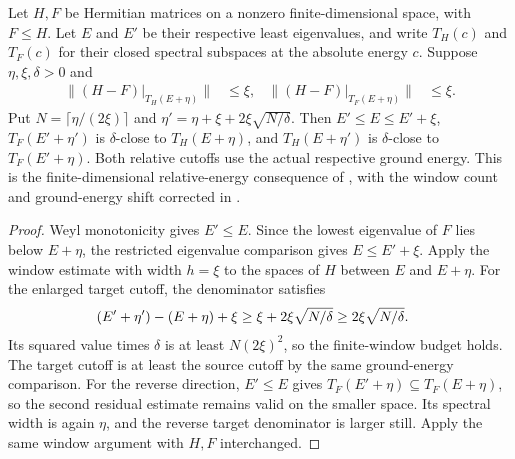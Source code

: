 \begin{theorem}
    \label{thm:relative_low_energy_spaces_close}
    \leanok
    Let $H,F$ be Hermitian matrices on a nonzero finite-dimensional space,
    with $F\le H$. Let $E$ and $E'$ be their respective least eigenvalues,
    and write $T_H(c)$ and $T_F(c)$ for their closed spectral subspaces
    at the absolute energy $c$.
    Suppose $\eta,\xi,\delta>0$ and
    \begin{align}
        \|(H-F)|_{T_H(E+\eta)}\| & \le\xi, &
        \|(H-F)|_{T_F(E+\eta)}\| & \le\xi.
        \label{eq:relative_low_energy_residuals}
    \end{align}
    Put $N=\lceil\eta/(2\xi)\rceil$ and
    $\eta'=\eta+\xi+2\xi\sqrt{N/\delta}$.
    Then $E'\le E\le E'+\xi$,
    $T_F(E'+\eta')$ is $\delta$-close to $T_H(E+\eta)$, and
    $T_H(E+\eta')$ is $\delta$-close to $T_F(E'+\eta)$.
    Both relative cutoffs use the actual respective ground energy.
    This is the finite-dimensional relative-energy consequence of
    \cite[lines 955--968]{Arad2016RigorousRG}, with the window count and
    ground-energy shift corrected in
    \cite{gap:alvv16_hard_truncation_windows}.
\end{theorem}
\begin{proof}
    \leanok
    Weyl monotonicity gives $E'\le E$. Since the lowest eigenvalue of
    $F$ lies below $E+\eta$, the restricted eigenvalue comparison gives
    $E\le E'+\xi$.
    Apply the window estimate with width $h=\xi$ to the spaces of $H$
    between $E$ and $E+\eta$. For the enlarged target cutoff, the
    denominator satisfies
    \begin{align}
        (E'+\eta')-(E+\eta)+\xi
         & \ge\xi+2\xi\sqrt{N/\delta}
        \ge2\xi\sqrt{N/\delta}.
        \notag
    \end{align}
    Its squared value times $\delta$ is at least $N(2\xi)^2$, so the
    finite-window budget holds. The target cutoff is at least the source
    cutoff by the same ground-energy comparison.
    For the reverse direction, $E'\le E$ gives
    $T_F(E'+\eta)\subseteq T_F(E+\eta)$, so the second residual estimate
    remains valid on the smaller space. Its spectral width is again
    $\eta$, and the reverse target denominator is larger still.
    Apply the same window argument with $H,F$ interchanged.
\end{proof}

